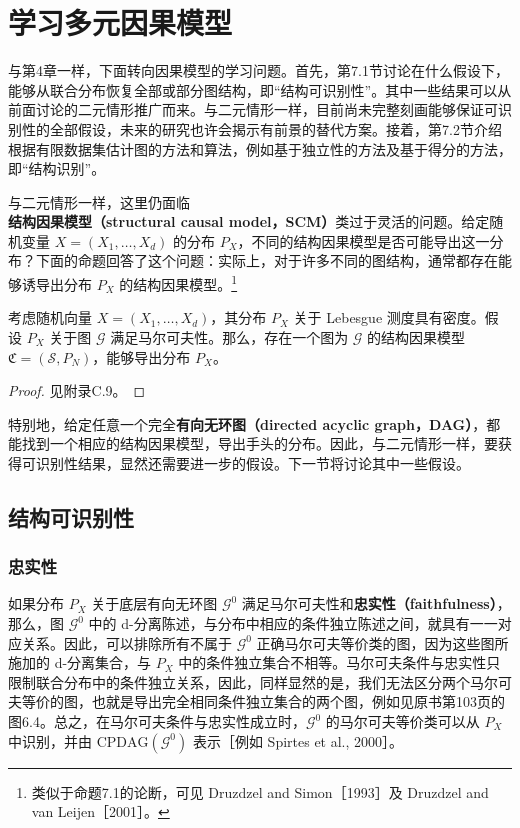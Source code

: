 \chapter{学习多元因果模型}
\label{ch:learning-multivariate}
\providecommand{\chseventnote}[1]{\stepcounter{chseventransnote}\begingroup
\renewcommand{\thefootnote}{译注\arabic{chseventransnote}}\footnote{#1}\addtocounter{footnote}{-1}\endgroup}

与第4章一样，下面转向因果模型的学习问题。首先，第7.1节讨论在什么假设下，能够从联合分布恢复全部或部分图结构，即“结构可识别性”。其中一些结果可以从前面讨论的二元情形推广而来。与二元情形一样，目前尚未完整刻画能够保证可识别性的全部假设，未来的研究也许会揭示有前景的替代方案。接着，第7.2节介绍根据有限数据集估计图的方法和算法，例如基于独立性的方法及基于得分的方法，即“结构识别”。

与二元情形一样，这里仍面临\textbf{结构因果模型（structural causal model，SCM）}类过于灵活的问题。给定随机变量 $X=(X_1,\ldots,X_d)$ 的分布 $P_X$，不同的结构因果模型是否可能导出这一分布？下面的命题回答了这个问题：实际上，对于许多不同的图结构，通常都存在能够诱导出分布 $P_X$ 的结构因果模型。\footnote{类似于命题7.1的论断，可见 Druzdzel and Simon［1993］及 Druzdzel and van Leijen［2001］。}

\begin{proposition}[图结构的非唯一性]
考虑随机向量 $X=(X_1,\ldots,X_d)$，其分布 $P_X$ 关于 Lebesgue 测度具有密度。假设 $P_X$ 关于图 $\mathcal G$ 满足马尔可夫性。那么，存在一个图为 $\mathcal G$ 的结构因果模型 $\mathfrak C=(\mathcal S,P_N)$，能够导出分布 $P_X$。
\end{proposition}
\begin{proof}
见附录C.9。
\end{proof}

特别地，给定任意一个完全\textbf{有向无环图（directed acyclic graph，DAG）}，都能找到一个相应的结构因果模型，导出手头的分布。因此，与二元情形一样，要获得可识别性结果，显然还需要进一步的假设。下一节将讨论其中一些假设。

\section{结构可识别性}
\subsection{忠实性}

如果分布 $P_X$ 关于底层有向无环图 $\mathcal G^0$ 满足马尔可夫性和\textbf{忠实性（faithfulness）}，那么，图 $\mathcal G^0$ 中的 d-分离陈述，与分布中相应的条件独立陈述之间，就具有一一对应关系。因此，可以排除所有不属于 $\mathcal G^0$ 正确马尔可夫等价类的图，因为这些图所施加的 d-分离集合，与 $P_X$ 中的条件独立集合不相等。马尔可夫条件与忠实性只限制联合分布中的条件独立关系，因此，同样显然的是，我们无法区分两个马尔可夫等价的图，也就是导出完全相同条件独立集合的两个图，例如见原书第103页的图6.4。总之，在马尔可夫条件与忠实性成立时，$\mathcal G^0$ 的马尔可夫等价类可以从 $P_X$ 中识别，并由 $\mathrm{CPDAG}(\mathcal G^0)$ 表示［例如 Spirtes et al., 2000］。


